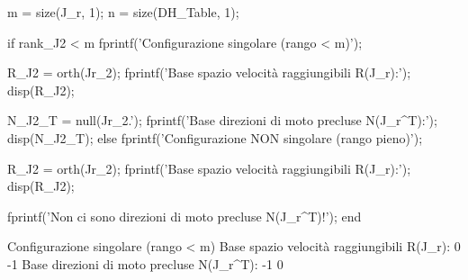 \documentclass[11pt, a4paper]{article}
\begin{document}
\begin{matlabcode}
m = size(J_r, 1);
n = size(DH_Table, 1);

if rank_J2 < m
    fprintf('Configurazione singolare (rango < m)');

    R_J2 = orth(Jr_2);
    fprintf('Base spazio velocità raggiungibili R(J_r):\n');
    disp(R_J2);

    N_J2_T = null(Jr_2.');
    fprintf('Base direzioni di moto precluse N(J_r^T):\n');
    disp(N_J2_T);
else
    fprintf('Configurazione NON singolare (rango pieno)');

    R_J2 = orth(Jr_2);
    fprintf('Base spazio velocità raggiungibili R(J_r):\n');
    disp(R_J2);

    fprintf('Non ci sono direzioni di moto precluse N(J_r^T)!');
end
\end{matlabcode}
\begin{matlaboutput}
Configurazione singolare (rango < m)
Base spazio velocità raggiungibili R(J_r):
     0
    -1
Base direzioni di moto precluse N(J_r^T):
    -1
     0
\end{matlaboutput}
\end{document}
